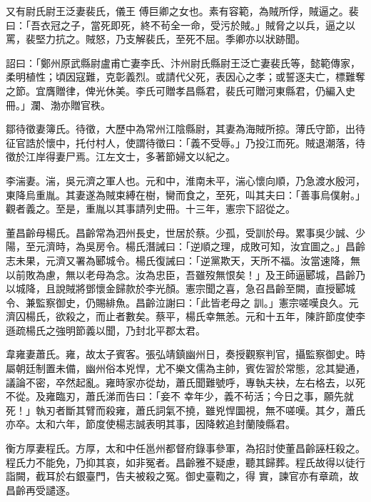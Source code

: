 \begin{pinyinscope}
 又有尉氏尉王泛妻裴氏，儀王
 傅巨卿之女也。素有容範，為賊所俘，賊逼之。裴曰：「吾衣冠之子，當死即死，終不茍全一命，受污於賊。」賊脅之以兵，逼之以罵，裴堅力抗之。賊怒，乃支解裴氏，至死不屈。季卿亦以狀跡聞。



 詔曰：「鄭州原武縣尉盧甫亡妻李氏、汴州尉氏縣尉王泛亡妻裴氏等，懿範傳家，柔明植性；頃因寇難，克彰義烈。或請代父死，表因心之孝；或誓逐夫亡，標難奪之節。宜膺贈律，俾光休美。李氏可贈孝昌縣君，裴氏可贈河東縣君，仍編入史冊。」瀾、渤亦贈官秩。



 鄒待徵妻簿氏。待徵，大歷中為常州江陰縣尉，其妻為海賊所掠。薄氏守節，出待征官誥於懷中，托付村人，使謂待徵曰：「義不受辱。」乃投江而死。賊退潮落，待徵於江岸得妻尸焉。江左文士，多著節婦文以紀之。



 李湍妻。湍，吳元濟之軍人也。元和中，淮南未平，湍心懷向順，乃急渡水殷河，東降烏重胤。其妻遂為賊束縛在樹，臠而食之，至死，叫其夫曰：「善事烏僕射。」觀者義之。至是，重胤以其事請列史冊。十三年，憲宗下詔從之。



 董昌齡母楊氏。昌齡常為泗州長史，世居於蔡。少孤，受訓於母。累事吳少誠、少陽，至元濟時，為吳房令。楊氏潛誡曰：「逆順之理，成敗可知，汝宜圖之。」昌齡志未果，元濟又署為郾城令。楊氏復誡曰：「逆黨欺天，天所不福。汝當速降，無以前敗為慮，無以老母為念。汝為忠臣，吾雖歿無恨矣！」及王師逼郾城，昌齡乃以城降，且說賊將鄧懷金歸款於李光顏。憲宗聞之喜，急召昌齡至闕，直授郾城令、兼監察御史，仍賜緋魚。昌齡泣謝曰：「此皆老母之
 訓。」憲宗嗟嘆良久。元濟囚楊氏，欲殺之，而止者數矣。蔡平，楊氏幸無恙。元和十五年，陳許節度使李遜疏楊氏之強明節義以聞，乃封北平郡太君。



 韋雍妻蕭氏。雍，故太子賓客。張弘靖鎮幽州日，奏授觀察判官，攝監察御史。時屬朝廷制置未備，幽州俗本兇悍，尤不樂文儒為主帥，賓佐習於常態，忿其變通，議論不密，卒然起亂。雍時家亦從劫，蕭氏聞難號呼，專執夫袂，左右格去，以死不從。及雍臨刃，蕭氏涕而告曰：「妾不
 幸年少，義不茍活；今日之事，願先就死！」執刃者斷其臂而殺雍，蕭氏詞氣不撓，雖兇悍圜視，無不嗟嘆。其夕，蕭氏亦卒。太和六年，節度使楊志誠表明其事，因降敕追封蘭陵縣君。



 衡方厚妻程氏。方厚，太和中任邕州都督府錄事參軍，為招討使董昌齡誣枉殺之。程氏力不能免，乃抑其哀，如非冤者。昌齡雅不疑慮，聽其歸葬。程氏故得以徒行詣闕，截耳於右銀臺門，告夫被殺之冤。御史臺鞫之，得
 實，諫官亦有章疏，故昌齡再受譴逐。




\end{pinyinscope}
